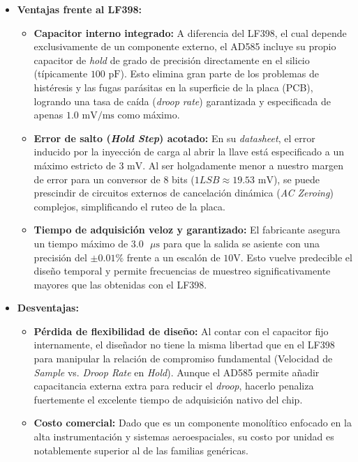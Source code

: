 \begin{itemize}
	\item \textbf{Ventajas frente al LF398:}
	\begin{itemize}
		\item \textbf{Capacitor interno integrado:} A diferencia del LF398, el cual depende exclusivamente de un componente externo, el AD585 incluye su propio capacitor de \textit{hold} de grado de precisión directamente en el silicio (típicamente $100\text{ pF}$). Esto elimina gran parte de los problemas de histéresis y las fugas parásitas en la superficie de la placa (PCB), logrando una tasa de caída (\textit{droop rate}) garantizada y especificada de apenas $1.0\text{ mV/ms}$ como máximo.
		\item \textbf{Error de salto (\textit{Hold Step}) acotado:} En su \textit{datasheet}, el error inducido por la inyección de carga al abrir la llave está especificado a un máximo estricto de $3\text{ mV}$. Al ser holgadamente menor a nuestro margen de error para un conversor de 8 bits ($1 LSB \approx 19.53\text{ mV}$), se puede prescindir de circuitos externos de cancelación dinámica (\textit{AC Zeroing}) complejos, simplificando el ruteo de la placa.
		\item \textbf{Tiempo de adquisición veloz y garantizado:} El fabricante asegura un tiempo máximo de $3.0\text{ }\mu\text{s}$ para que la salida se asiente con una precisión del $\pm 0.01\%$ frente a un escalón de $10\text{V}$. Esto vuelve predecible el diseño temporal y permite frecuencias de muestreo significativamente mayores que las obtenidas con el LF398.
	\end{itemize}
	
	\item \textbf{Desventajas:}
	\begin{itemize}
		\item \textbf{Pérdida de flexibilidad de diseño:} Al contar con el capacitor fijo internamente, el diseñador no tiene la misma libertad que en el LF398 para manipular la relación de compromiso fundamental (Velocidad de \textit{Sample} vs. \textit{Droop Rate} en \textit{Hold}). Aunque el AD585 permite añadir capacitancia externa extra para reducir el \textit{droop}, hacerlo penaliza fuertemente el excelente tiempo de adquisición nativo del chip.
		\item \textbf{Costo comercial:} Dado que es un componente monolítico enfocado en la alta instrumentación y sistemas aeroespaciales, su costo por unidad es notablemente superior al de las familias genéricas.
	\end{itemize}
\end{itemize}